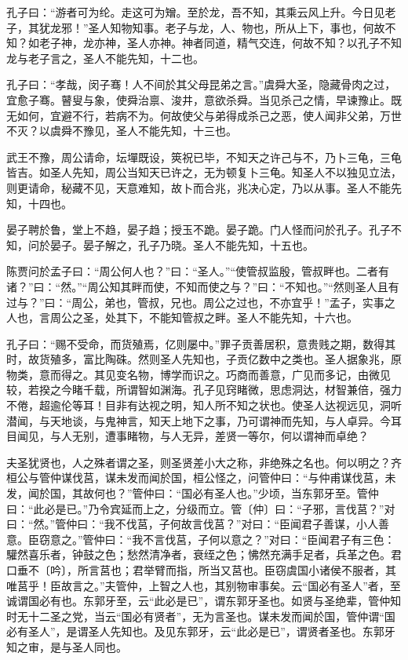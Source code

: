 \documentclass[]{article}
\begin{document}
孔子曰：``游者可为纶。走这可为矰。至於龙，吾不知，其乘云风上升。今日见老子，其犹龙邪！''圣人知物知事。老子与龙，人、物也，所从上下，事也，何故不知？如老子神，龙亦神，圣人亦神。神者同道，精气交连，何故不知？以孔子不知龙与老子言之，圣人不能先知，十二也。

孔子曰：``孝哉，闵子骞！人不间於其父母昆弟之言。''虞舜大圣，隐藏骨肉之过，宜愈子骞。瞽叟与象，使舜治禀、浚井，意欲杀舜。当见杀己之情，早谏豫止。既无如何，宜避不行，若病不为。何故使父与弟得成杀己之恶，使人闻非父弟，万世不灭？以虞舜不豫见，圣人不能先知，十三也。

武王不豫，周公请命，坛墠既设，筴祝已毕，不知天之许己与不，乃卜三龟，三龟皆吉。如圣人先知，周公当知天已许之，无为顿复卜三龟。知圣人不以独见立法，则更请命，秘藏不见，天意难知，故卜而合兆，兆决心定，乃以从事。圣人不能先知，十四也。

晏子聘於鲁，堂上不趋，晏子趋；授玉不跪。晏子跪。门人怪而问於孔子。孔子不知，问於晏子。晏子解之，孔子乃晓。圣人不能先知，十五也。

陈贾问於孟子曰：``周公何人也？''曰：``圣人。''``使管叔监殷，管叔畔也。二者有诸？''曰：``然。''``周公知其畔而使，不知而使之与？''曰：``不知也。''``然则圣人且有过与？''曰：``周公，弟也，管叔，兄也。周公之过也，不亦宜乎！''孟子，实事之人也，言周公之圣，处其下，不能知管叔之畔。圣人不能先知，十六也。

孔子曰：``赐不受命，而货殖焉，亿则屡中。''罪子贡善居积，意贵贱之期，数得其时，故货殖多，富比陶硃。然则圣人先知也，子贡亿数中之类也。圣人据象兆，原物类，意而得之。其见变名物，博学而识之。巧商而善意，广见而多记，由微见较，若揆之今睹千载，所谓智如渊海。孔子见窍睹微，思虑洞达，材智兼倍，强力不倦，超逾伦等耳！目非有达视之明，知人所不知之状也。使圣人达视远见，洞听潜闻，与天地谈，与鬼神言，知天上地下之事，乃可谓神而先知，与人卓异。今耳目闻见，与人无别，遭事睹物，与人无异，差贤一等尔，何以谓神而卓绝？

夫圣犹贤也，人之殊者谓之圣，则圣贤差小大之称，非绝殊之名也。何以明之？齐桓公与管仲谋伐莒，谋未发而闻於国，桓公怪之，问管仲曰：``与仲甫谋伐莒，未发，闻於国，其故何也？''管仲曰：``国必有圣人也。''少顷，当东郭牙至。管仲曰：``此必是已。''乃令宾延而上之，分级而立。管〔仲〕曰：``子邪，言伐莒？''对曰：``然。''管仲曰：``我不伐莒，子何故言伐莒？''对曰：``臣闻君子善谋，小人善意。臣窃意之。''管仲曰：``我不言伐莒，子何以意之？''对曰：``臣闻君子有三色：驩然喜乐者，钟鼓之色；愁然清净者，衰绖之色；怫然充满手足者，兵革之色。君口垂不〔吟〕，所言莒也；君举臂而指，所当又莒也。臣窃虞国小诸侯不服者，其唯莒乎！臣故言之。''夫管仲，上智之人也，其别物审事矣。云``国必有圣人''者，至诚谓国必有也。东郭牙至，云``此必是已''，谓东郭牙圣也。如贤与圣绝辈，管仲知时无十二圣之党，当云``国必有贤者''，无为言圣也。谋未发而闻於国，管仲谓``国必有圣人''，是谓圣人先知也。及见东郭牙，云``此必是已''，谓贤者圣也。东郭牙知之审，是与圣人同也。
\end{document}
